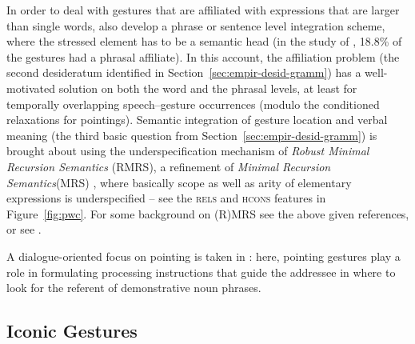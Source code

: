 \documentclass[output=paper
 	        ,biblatex
                ,babelshorthands
                ,newtxmath
                ,draftmode
                ,colorlinks, citecolor=brown
]{langscibook}
\begin{document}
In order to deal with gestures that are affiliated with expressions that are larger than single words, \citet{Alahverdzhieva:Lascarides:Flickinger:2017} also develop a phrase or sentence level integration scheme, where the stressed element has to be a semantic head (in the study of \citealt{Mehler:Luecking:2012:d}, 18.8\% of the gestures had a phrasal affiliate).
%
In this account, the affiliation problem (the second desideratum identified in Section~\ref{sec:empir-desid-gramm}) has a well-motivated solution on both the word and the phrasal levels, at least for temporally overlapping speech--gesture occurrences (modulo the conditioned relaxations for pointings).
%
Semantic integration of gesture location and verbal meaning (the third basic question from Section~\ref{sec:empir-desid-gramm}) is brought about using the underspecification mechanism of \emph{Robust Minimal Recursion Semantics} (RMRS), a refinement of \emph{Minimal Recursion Semantics}\indexmrs (MRS) \citep{Copestake:Flickinger:Pollard:Sag:2005}, where basically scope as well as arity of elementary expressions is underspecified \citep{Copestake:2007} -- see the \textsc{rels} and \textsc{hcons} features in Figure~\ref{fig:pwc}.
%
For some background on (R)MRS see the above given references, or see . %


A dialogue-oriented focus on pointing is taken in \citet{Luecking:2018:a}: here, pointing gestures play a role in formulating processing instructions that guide the addressee in where to look for the referent of demonstrative noun phrases. %



\subsection{Iconic Gestures}
\label{sec:iconic-gestures}
\end{document}
